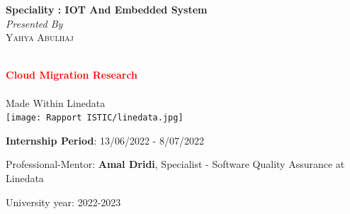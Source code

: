 \begin{titlepage}
\textbf{Speciality : IOT And Embedded System}\\[0.3cm]

\vskip1cm%
\textit{Presented By}\\
\vskip0.5cm%
\textsc{\large Yahya Abulhaj}\\[0.5cm] %
\smallskip


\HRule \\[0.4cm]
\textcolor{red}{ \LARGE \bfseries Cloud Migration Research}\\[0.4cm] %
\HRule \\[1cm]
{Made Within Linedata}\\
\texttt{[image: Rapport ISTIC/linedata.jpg]}\\

\vskip1cm

 \begin{flushleft}
 \begin{center}
\textbf{Internship Period}: 13/06/2022 - 8/07/2022
\end{center}
\vskip1cm
\begin{center}
Professional-Mentor: \textbf{Amal Dridi}, Specialist - Software Quality Assurance at Linedata\\
\end{center}
\begin{minipage}[c]{0.6\columnwidth}


\end{minipage}
 \end{flushleft}
 


\vskip2cm

{\large University year: 2022-2023}\\[3cm] 



\vfill %

\end{titlepage}
%